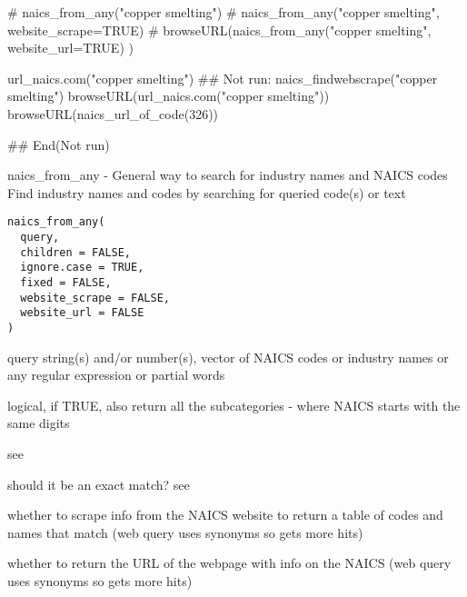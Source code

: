 \documentclass[a4paper]{book}
\begin{document}
%
\begin{SeeAlso}\relax
{}  
\end{SeeAlso}
%
\begin{Examples}
\begin{ExampleCode}
 # naics_from_any("copper smelting")
 # naics_from_any("copper smelting", website_scrape=TRUE)
 # browseURL(naics_from_any("copper smelting", website_url=TRUE) )
 
  url_naics.com("copper smelting")
  ## Not run: 
  naics_findwebscrape("copper smelting")
  browseURL(url_naics.com("copper smelting"))
  browseURL(naics_url_of_code(326))
  
## End(Not run)
\end{ExampleCode}
\end{Examples}
%
\begin{Description}\relax
naics\_from\_any - General way to search for industry names and NAICS codes
Find industry names and codes by searching for queried code(s) or text
\end{Description}
%
\begin{Usage}
\begin{verbatim}
naics_from_any(
  query,
  children = FALSE,
  ignore.case = TRUE,
  fixed = FALSE,
  website_scrape = FALSE,
  website_url = FALSE
)
\end{verbatim}
\end{Usage}
%
\begin{Arguments}
\begin{ldescription}
\item[\code{query}] query string(s) and/or number(s), vector of NAICS codes or industry names or any regular expression or partial words

\item[\code{children}] logical, if TRUE, also return all the subcategories - where NAICS starts with the same digits

\item[\code{ignore.case}] see 

\item[\code{fixed}] should it be an exact match? see 

\item[\code{website\_scrape}] whether to scrape info from the NAICS website to return a table of codes and names that match (web query uses synonyms so gets more hits)

\item[\code{website\_url}] whether to return the URL of the webpage with info on the NAICS (web query uses synonyms so gets more hits)
\end{ldescription}
\end{Arguments}
\end{document}
